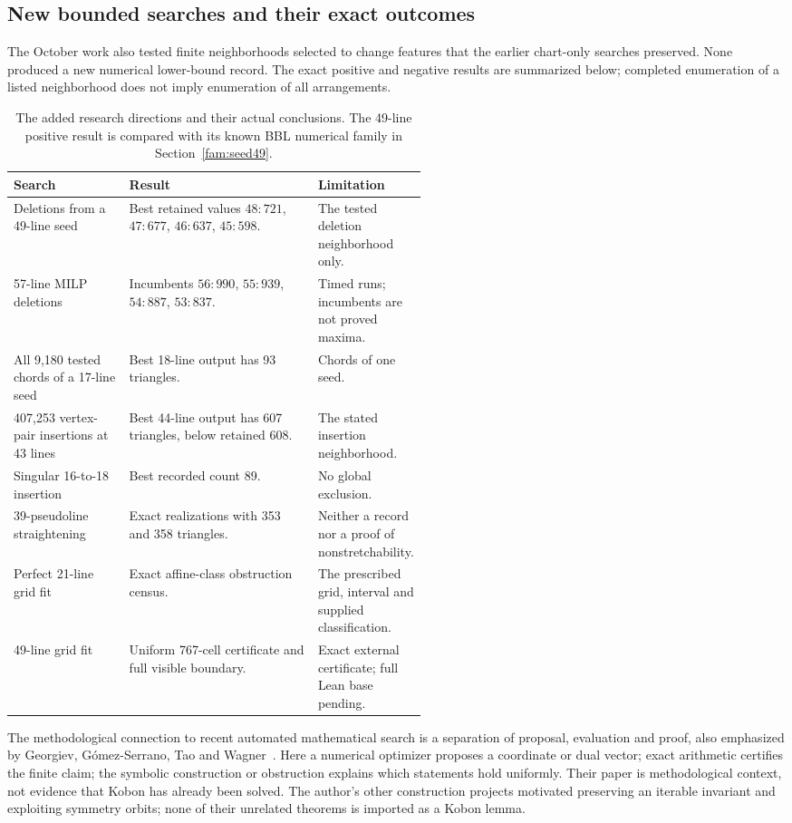 \subsection{New bounded searches and their exact outcomes}

The October work also tested finite neighborhoods selected to change
features that the earlier chart-only searches preserved. None produced
a new numerical lower-bound record. The exact positive and negative
results are summarized below; completed enumeration of a listed
neighborhood does not imply enumeration of all arrangements.

\begin{table}[tb]
\centering\small
\begin{tabularx}{\linewidth}{@{}P{0.29\linewidth}XP{0.24\linewidth}@{}}
\toprule
Search & Result & Limitation\\
\midrule
Deletions from a 49-line seed & Best retained values $48:721$, $47:677$,
$46:637$, $45:598$. & The tested deletion neighborhood only.\\
57-line MILP deletions & Incumbents $56:990$, $55:939$, $54:887$,
$53:837$. & Timed runs; incumbents are not proved maxima.\\
All 9,180 tested chords of a 17-line seed & Best 18-line output has 93
triangles. & Chords of one seed.\\
407,253 vertex-pair insertions at 43 lines & Best 44-line output has
607 triangles, below retained 608. & The stated insertion neighborhood.\\
Singular 16-to-18 insertion & Best recorded count 89. & No global
exclusion.\\
39-pseudoline straightening & Exact realizations with 353 and 358
triangles. & Neither a record nor a proof of nonstretchability.\\
Perfect 21-line grid fit & Exact affine-class obstruction census. & The
prescribed grid, interval and supplied classification.\\
49-line grid fit & Uniform 767-cell certificate and full visible boundary.
& Exact external certificate; full Lean base pending.\\
\bottomrule
\end{tabularx}
\caption{The added research directions and their actual conclusions.
The 49-line positive result is compared with its known BBL numerical
family in Section~\ref{fam:seed49}.}
\label{exp:october-searches}
\end{table}

The methodological connection to recent automated mathematical search
is a separation of proposal, evaluation and proof, also emphasized by
Georgiev, G\'omez-Serrano, Tao and Wagner~\cite{georgiev2025}. Here a
numerical optimizer proposes a coordinate or dual vector; exact
arithmetic certifies the finite claim; the symbolic construction or
obstruction explains which statements hold uniformly. Their paper is
methodological context, not evidence that Kobon has already been solved.
The author's other construction projects motivated preserving an
iterable invariant and exploiting symmetry orbits; none of their
unrelated theorems is imported as a Kobon lemma.

